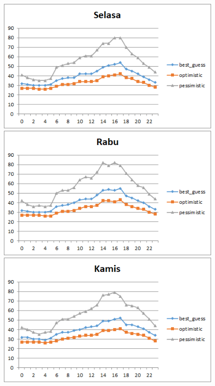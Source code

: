 \begin{figure}[H]
				\centering		
				\includegraphics[]{Gambar/selasasampel217072017normal.png}
				\includegraphics[]{Gambar/rabusampel217072017normal.png}
				\includegraphics[]{Gambar/kamissampel217072017normal.png}
\end{figure}			
			
